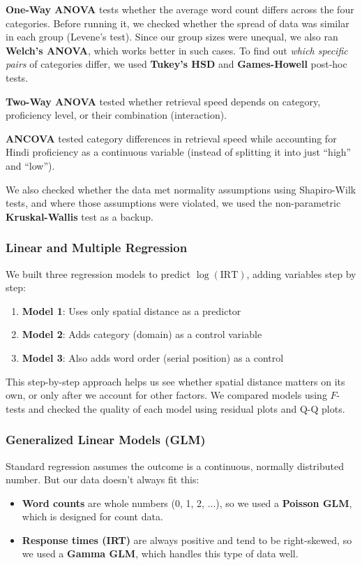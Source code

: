 \documentclass[12pt, a4paper]{article}
\begin{document}
\textbf{One-Way ANOVA} tests whether the average word count differs across the four categories. Before running it, we checked whether the spread of data was similar in each group (Levene's test). Since our group sizes were unequal, we also ran \textbf{Welch's ANOVA}, which works better in such cases. To find out \textit{which specific pairs} of categories differ, we used \textbf{Tukey's HSD} and \textbf{Games-Howell} post-hoc tests.

\textbf{Two-Way ANOVA} tested whether retrieval speed depends on category, proficiency level, or their combination (interaction).

\textbf{ANCOVA} tested category differences in retrieval speed while accounting for Hindi proficiency as a continuous variable (instead of splitting it into just ``high'' and ``low'').

We also checked whether the data met normality assumptions using Shapiro-Wilk tests, and where those assumptions were violated, we used the non-parametric \textbf{Kruskal-Wallis} test as a backup.

\subsubsection{Linear and Multiple Regression}

We built three regression models to predict $\log(\text{IRT})$, adding variables step by step:
\begin{enumerate}[nosep]
    \item \textbf{Model 1}: Uses only spatial distance as a predictor
    \item \textbf{Model 2}: Adds category (domain) as a control variable
    \item \textbf{Model 3}: Also adds word order (serial position) as a control
\end{enumerate}

This step-by-step approach helps us see whether spatial distance matters on its own, or only after we account for other factors. We compared models using $F$-tests and checked the quality of each model using residual plots and Q-Q plots.

\subsubsection{Generalized Linear Models (GLM)}

Standard regression assumes the outcome is a continuous, normally distributed number. But our data doesn't always fit this:
\begin{itemize}[nosep]
    \item \textbf{Word counts} are whole numbers (0, 1, 2, ...), so we used a \textbf{Poisson GLM}, which is designed for count data.
    \item \textbf{Response times (IRT)} are always positive and tend to be right-skewed, so we used a \textbf{Gamma GLM}, which handles this type of data well.
\end{itemize}
\end{document}
